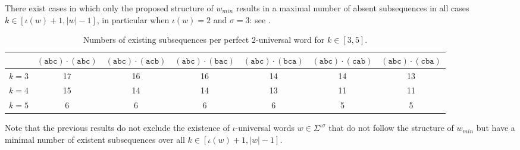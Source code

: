 \documentclass[runningheads,UKenglish,cleveref, autoref, thm-restate]{llncs}
\begin{document}
There exist cases in which only the proposed structure of $w_{min}$ results in a maximal number of absent subsequences in all cases $k\in[\iota(w)+1,|w|-1]$, in particular when $\iota(w) = 2$ and $\sigma = 3$: see .
\begin{table}[h!]
	\begin{tabular}{c|c|c|c|c|c|c|}
		& $\mathtt{(abc)\cdot (abc)}$ & $\mathtt{(abc) \cdot (acb)}$ & $\mathtt{(abc) \cdot (bac)}$ & $\mathtt{(abc) \cdot (bca)}$ & $\mathtt{(abc) \cdot (cab)}$ & $\mathtt{(abc) \cdot (cba)}$ \\
		\hline
		$k=3$ & 17 & 16 & 16 & 14 & 14 & 13\\
		$k=4$ & 15 & 14 & 14 & 13 & 11 & 11\\
		$k=5$ & 6 & 6 & 6 & 6 & 5 & 5
	\end{tabular}
	\caption{Numbers of existing subsequences per perfect $2$-universal word for $k \in [3,5]$.}\label{tableminimalexisting}
\end{table}

Note that the previous results do not exclude the existence of $\iota$-universal words $w\in\Sigma^{\iota\sigma}$ that do not follow the structure of $w_{min}$ but have a minimal number of existent subsequences over all $k \in [\iota(w)+1,|w|-1]$. 


	
\end{document}
